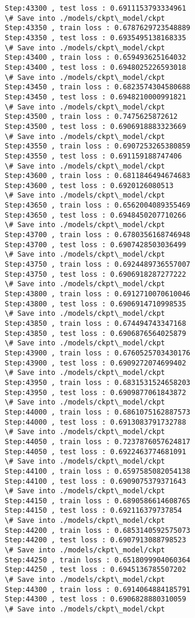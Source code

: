 \documentclass[11pt]{article}
\begin{document}
\begin{Verbatim}[commandchars=\\\{\}]
Step:43300 , test loss : 0.6911153793334961
\# Save into ./models/ckpt\_model/ckpt
Step:43350 , train loss : 0.6787629723548889
Step:43350 , test loss : 0.6935495138168335
\# Save into ./models/ckpt\_model/ckpt
Step:43400 , train loss : 0.659493625164032
Step:43400 , test loss : 0.6948025226593018
\# Save into ./models/ckpt\_model/ckpt
Step:43450 , train loss : 0.6823574304580688
Step:43450 , test loss : 0.6948210000991821
\# Save into ./models/ckpt\_model/ckpt
Step:43500 , train loss : 0.7475625872612
Step:43500 , test loss : 0.6906918883323669
\# Save into ./models/ckpt\_model/ckpt
Step:43550 , train loss : 0.6907253265380859
Step:43550 , test loss : 0.691159188747406
\# Save into ./models/ckpt\_model/ckpt
Step:43600 , train loss : 0.6811846494674683
Step:43600 , test loss : 0.6920126080513
\# Save into ./models/ckpt\_model/ckpt
Step:43650 , train loss : 0.6562004089355469
Step:43650 , test loss : 0.6948450207710266
\# Save into ./models/ckpt\_model/ckpt
Step:43700 , train loss : 0.6780356168746948
Step:43700 , test loss : 0.6907428503036499
\# Save into ./models/ckpt\_model/ckpt
Step:43750 , train loss : 0.6924489736557007
Step:43750 , test loss : 0.6906918287277222
\# Save into ./models/ckpt\_model/ckpt
Step:43800 , train loss : 0.6912710070610046
Step:43800 , test loss : 0.6906914710998535
\# Save into ./models/ckpt\_model/ckpt
Step:43850 , train loss : 0.674494743347168
Step:43850 , test loss : 0.6906876564025879
\# Save into ./models/ckpt\_model/ckpt
Step:43900 , train loss : 0.6760525703430176
Step:43900 , test loss : 0.6909272074699402
\# Save into ./models/ckpt\_model/ckpt
Step:43950 , train loss : 0.6831531524658203
Step:43950 , test loss : 0.6909877061843872
\# Save into ./models/ckpt\_model/ckpt
Step:44000 , train loss : 0.6861075162887573
Step:44000 , test loss : 0.6913083791732788
\# Save into ./models/ckpt\_model/ckpt
Step:44050 , train loss : 0.7237876057624817
Step:44050 , test loss : 0.6922463774681091
\# Save into ./models/ckpt\_model/ckpt
Step:44100 , train loss : 0.6597585082054138
Step:44100 , test loss : 0.6909075379371643
\# Save into ./models/ckpt\_model/ckpt
Step:44150 , train loss : 0.6890586614608765
Step:44150 , test loss : 0.692116379737854
\# Save into ./models/ckpt\_model/ckpt
Step:44200 , train loss : 0.6853140592575073
Step:44200 , test loss : 0.6907913088798523
\# Save into ./models/ckpt\_model/ckpt
Step:44250 , train loss : 0.6518099904060364
Step:44250 , test loss : 0.6945136785507202
\# Save into ./models/ckpt\_model/ckpt
Step:44300 , train loss : 0.6914064884185791
Step:44300 , test loss : 0.6906828880310059
\# Save into ./models/ckpt\_model/ckpt

\end{Verbatim}
\end{document}
